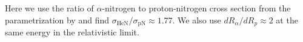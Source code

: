 Here we use the ratio of $\alpha$-nitrogen to proton-nitrogen
cross section from the parametrization by \cite{WAtwater}
and find $\sigma_{\text{HeN}}/\sigma_\text{pN} \approx 1.77$.
We also use $dR_\alpha/dR_p\approx2$ at
the same energy in the relativistic limit. 



